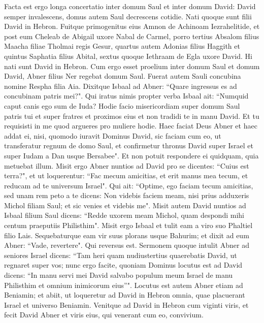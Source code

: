 \begin{biblechapter}  
\verse Facta est ergo longa concertatio inter domum Saul et inter domum David: David semper invalescens, domus autem Saul decrescens cotidie. 
\verse Nati quoque sunt filii David in Hebron. Fuitque primogenitus eius Amnon de Achinoam Iezrahelitide, 
\verse et post eum Cheleab de Abigail uxore Nabal de Carmel, porro tertius Absalom filius Maacha filiae Tholmai regis Gesur, 
\verse quartus autem Adonias filius Haggith et quintus Saphatia filius Abital, 
\verse sextus quoque Iethraam de Egla uxore David. Hi nati sunt David in Hebron. 
\verse Cum ergo esset proelium inter domum Saul et domum David, Abner filius Ner regebat domum Saul. 
\verse Fuerat autem Sauli concubina nomine Respha filia Aia. Dixitque Isbaal ad Abner: 
\verse “Quare ingressus es ad concubinam patris mei?". Qui iratus nimis propter verba Isbaal ait: “Numquid caput canis ego sum de Iuda? Hodie facio misericordiam super domum Saul patris tui et super fratres et proximos eius et non tradidi te in manu David. Et tu requisisti in me quod argueres pro muliere hodie. 
\verse Haec faciat Deus Abner et haec addat ei, nisi, quomodo iuravit Dominus David, sic faciam cum eo, 
\verse ut transferatur regnum de domo Saul, et confirmetur thronus David super Israel et super Iudam a Dan usque Bersabee". 
\verse Et non potuit respondere ei quidquam, quia metuebat illum. 
\verse Misit ergo Abner nuntios ad David pro se dicentes: “Cuius est terra?", et ut loquerentur: “Fac mecum amicitias, et erit manus mea tecum, et reducam ad te universum Israel". 
\verse Qui ait: “Optime, ego faciam tecum amicitias, sed unam rem peto a te dicens: Non videbis faciem meam, nisi prius adduxeris Michol filiam Saul; et sic venies et videbis me". 
\verse Misit autem David nuntios ad Isbaal filium Saul dicens: “Redde uxorem meam Michol, quam despondi mihi centum praeputiis Philisthim". 
\verse Misit ergo Isbaal et tulit eam a viro suo Phaltiel filio Lais. 
\verse Sequebaturque eam vir suus plorans usque Bahurim; et dixit ad eum Abner: “Vade, revertere". Qui reversus est. 
\verse Sermonem quoque intulit Abner ad seniores Israel dicens: “Tam heri quam nudiustertius quaerebatis David, ut regnaret super vos; 
\verse nunc ergo facite, quoniam Dominus locutus est ad David dicens: “In manu servi mei David salvabo populum meum Israel de manu Philisthim et omnium inimicorum eius”". 
\verse Locutus est autem Abner etiam ad Beniamin; et abiit, ut loqueretur ad David in Hebron omnia, quae placuerant Israel et universo Beniamin. 
\verse Venitque ad David in Hebron cum viginti viris, et fecit David Abner et viris eius, qui venerant cum eo, convivium. 

\end{biblechapter}
